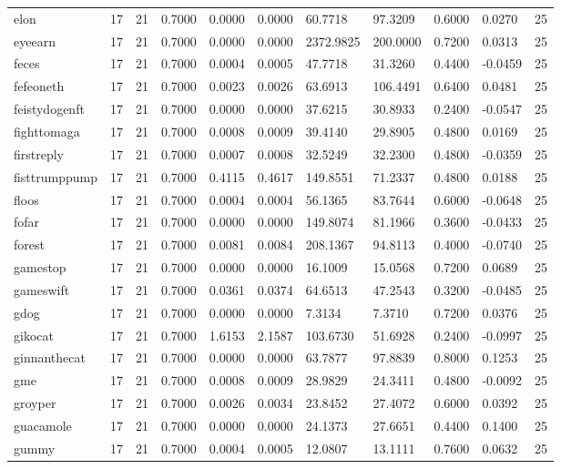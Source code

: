 \begin{table}[htbp]
\begin{tabular}{lllllllllll}
elon & 17 & 21 & 0.7000 & 0.0000 & 0.0000 & 60.7718 & 97.3209 & 0.6000 & 0.0270 & 25 \\
eyeearn & 17 & 21 & 0.7000 & 0.0000 & 0.0000 & 2372.9825 & 200.0000 & 0.7200 & 0.0313 & 25 \\
feces & 17 & 21 & 0.7000 & 0.0004 & 0.0005 & 47.7718 & 31.3260 & 0.4400 & -0.0459 & 25 \\
fefeoneth & 17 & 21 & 0.7000 & 0.0023 & 0.0026 & 63.6913 & 106.4491 & 0.6400 & 0.0481 & 25 \\
feistydogenft & 17 & 21 & 0.7000 & 0.0000 & 0.0000 & 37.6215 & 30.8933 & 0.2400 & -0.0547 & 25 \\
fighttomaga & 17 & 21 & 0.7000 & 0.0008 & 0.0009 & 39.4140 & 29.8905 & 0.4800 & 0.0169 & 25 \\
firstreply & 17 & 21 & 0.7000 & 0.0007 & 0.0008 & 32.5249 & 32.2300 & 0.4800 & -0.0359 & 25 \\
fisttrumppump & 17 & 21 & 0.7000 & 0.4115 & 0.4617 & 149.8551 & 71.2337 & 0.4800 & 0.0188 & 25 \\
floos & 17 & 21 & 0.7000 & 0.0004 & 0.0004 & 56.1365 & 83.7644 & 0.6000 & -0.0648 & 25 \\
fofar & 17 & 21 & 0.7000 & 0.0000 & 0.0000 & 149.8074 & 81.1966 & 0.3600 & -0.0433 & 25 \\
forest & 17 & 21 & 0.7000 & 0.0081 & 0.0084 & 208.1367 & 94.8113 & 0.4000 & -0.0740 & 25 \\
gamestop & 17 & 21 & 0.7000 & 0.0000 & 0.0000 & 16.1009 & 15.0568 & 0.7200 & 0.0689 & 25 \\
gameswift & 17 & 21 & 0.7000 & 0.0361 & 0.0374 & 64.6513 & 47.2543 & 0.3200 & -0.0485 & 25 \\
gdog & 17 & 21 & 0.7000 & 0.0000 & 0.0000 & 7.3134 & 7.3710 & 0.7200 & 0.0376 & 25 \\
gikocat & 17 & 21 & 0.7000 & 1.6153 & 2.1587 & 103.6730 & 51.6928 & 0.2400 & -0.0997 & 25 \\
ginnanthecat & 17 & 21 & 0.7000 & 0.0000 & 0.0000 & 63.7877 & 97.8839 & 0.8000 & 0.1253 & 25 \\
gme & 17 & 21 & 0.7000 & 0.0008 & 0.0009 & 28.9829 & 24.3411 & 0.4800 & -0.0092 & 25 \\
groyper & 17 & 21 & 0.7000 & 0.0026 & 0.0034 & 23.8452 & 27.4072 & 0.6000 & 0.0392 & 25 \\
guacamole & 17 & 21 & 0.7000 & 0.0000 & 0.0000 & 24.1373 & 27.6651 & 0.4400 & 0.1400 & 25 \\
gummy & 17 & 21 & 0.7000 & 0.0004 & 0.0005 & 12.0807 & 13.1111 & 0.7600 & 0.0632 & 25 \\

\end{tabular}
\end{table}
